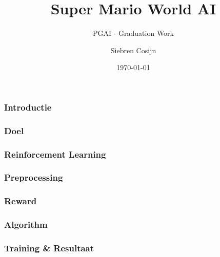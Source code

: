 \documentclass{beamer}
\title{Super Mario World AI}
\subtitle{PGAI - Graduation Work}
\author{Siebren Cosijn}
\date{\today}
\begin{document}
    \begin{frame}
        \titlepage
    \end{frame}

    \begin{frame}
        \frametitle{Introductie}
    \end{frame}

    \begin{frame}
        \frametitle{Doel}
    \end{frame}

    \begin{frame}
        \frametitle{Reinforcement Learning}
    \end{frame}

    \begin{frame}
        \frametitle{Preprocessing}
    \end{frame}

    \begin{frame}
        \frametitle{Reward}
    \end{frame}

    \begin{frame}
        \frametitle{Algorithm}
    \end{frame}

    \begin{frame}
        \frametitle{Training \& Resultaat}
    \end{frame}
\end{document}
